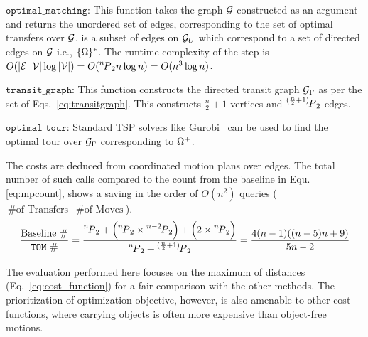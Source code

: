 \noindent $ \mathtt{optimal\_matching} $: This function takes the graph $ \graph $ constructed as an argument and returns the unordered set of edges, corresponding to the set of optimal transfers over $ \graph $. 
is a subset of edges on $ \graph_U $ which correspond to a set of directed edges on $ \graph $ i.e., $ \scomaset^* $. The runtime complexity of the step is $ O(|\edges||\nodes|\log|\nodes|) = O(\permu[n]{2}n\log n ) = O(n^3\log n)$.

\noindent $ \mathtt{transit\_graph} $: This function constructs the directed transit graph $ \tspgraph $ as per the set of Eqs.~\ref{eq:transitgraph}. This constructs $ \frac{n}{2} + 1 $ vertices and $ \permu[(\frac{n}{2} + 1)]{2} $ edges.

\noindent $\mathtt{optimal\_tour}  $: Standard TSP solvers like Gurobi~\cite{gurobi} can be used to find the  
optimal tour over $ \tspgraph $ corresponding to $ \scoma^+ $.

The costs are deduced from coordinated motion plans over edges. The total number of such calls compared to the count from the baseline in Equ. \ref{eq:mpcount}, shows a saving in the order of $ O(n^2)$ queries ($\textrm{\# of Transfers} + \textrm{\# of Moves}$). 
\vspace{-0.1in}
$$
\frac{\textrm{Baseline}\ \#}{{\algo}\ \#} = 
\frac{  {\permu[n]{2}} +   \Big{(}{{\permu[n]{2}}\times\permu[n-2]{2}}\Big{)} + \Big{(}2\times{\permu[n]{2}}\Big{)}   }
{\permu[n]{2} + \permu[(\frac{n}{2} + 1)]{2}} =
\frac{4(n-1)((n-5)n+9)}{5n-2}
$$\vspace{-0.1in}

The evaluation performed here focuses on the maximum of distances (Eq.~\ref{eq:cost_function}) for a fair comparison with the other methods. The prioritization of optimization objective, however, is also amenable to other cost functions, where carrying objects is often more expensive than object-free motions. 